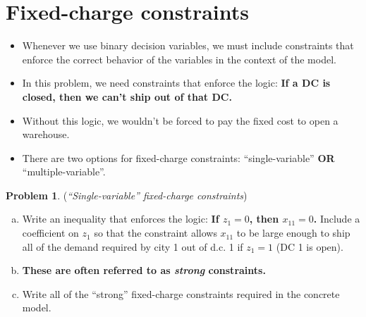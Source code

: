 \documentclass[11pt]{article}
\theoremstyle{definition}
\newtheorem{problem}{Problem}
\newcommand{\answerbox}[3]{%
  \fbox{%
    \begin{minipage}[#1]{#2}
      \hfill\vspace{#3}
    \end{minipage}
  }
}
\newcommand{\answerboxone}[2]{%
  \answerbox{#1}{6.0in}{#2} 
}
\begin{document}
\newpage

\section{Fixed-charge constraints}

\begin{itemize}
\item Whenever we use binary decision variables, we must include constraints that enforce the correct behavior of the variables in the context of the model.  
\item In this problem, we need constraints that enforce the logic: \textbf{If a DC is closed, then we can't ship out of that DC.}
\item Without this logic, we wouldn't be forced to pay the fixed cost to open a warehouse.
\item There are two options for fixed-charge constraints:  ``single-variable''  \textbf{OR} ``multiple-variable''. 
\end{itemize}

\begin{problem}  (\emph{``Single-variable'' fixed-charge constraints}) 

\vspace{-.1in}
\begin{enumerate}[a.]
\item Write an inequality that enforces the logic:
\textbf{ If $z_1 = 0$, then $x_{11} = 0$.}  Include a coefficient on  $z_1$ so that the constraint allows $x_{11}$ to be large enough to ship all of the demand required by city 1 out of d.c. 1 if $z_1=1$ (DC 1 is open).

\answerboxone{c}{0.5 in}

\item[] \textbf{These are often referred to as \emph{strong} constraints.}
\item Write all of the ``strong'' fixed-charge constraints required in the concrete model.

\answerboxone{c}{1.5 in}
\end{enumerate}
\end{problem}
\end{document}
